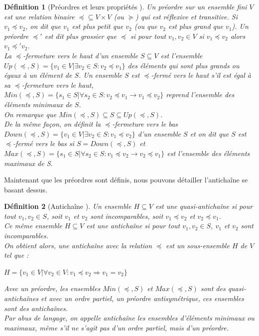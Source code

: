 \documentclass[11pt,a4paper,oneside]{book}
\theoremstyle{break}
\newtheorem{defin}{Définition}
\theoremstyle{breakplain}
\begin{document}
\begin{defin}[Préordres et leurs propriétés \cite{doyen2010antichain}]
Un préordre sur un ensemble fini $V$ est une relation binaire $\preceq \subseteq V \times V$ (ou $\succeq$) qui est réflexive et transitive. Si $v_1 \preceq v_2$, on dit que $v_1$ est plus petit que $v_2$ (ou que $v_2$ est plus grand que $v_1$).
Un préordre $\preceq'$ est dit plus grossier que $\preceq$ si pour tout $v_1, v_2 \in V$ si $v_1 \preceq v_2$ alors $v_1 \preceq' v_2$.\\
La $\preceq$-fermeture vers le haut d'un ensemble $S \subseteq V$ est l'ensemble $Up(\preceq, S) = \{ v_1 \in V | \exists v_2 \in S : v_2 \preceq v_1 \}$ des éléments qui sont plus grands ou égaux à un élément de $S$.
Un ensemble $S$ est $\preceq$-fermé vers le haut s'il est égal à sa $\preceq$-fermeture vers le haut, $Min(\preceq, S) = \{s_1 \in S | \forall s_2 \in S : v_2 \preceq v_1 \rightarrow v_1 \preceq v_2 \}$ reprend l'ensemble des éléments minimaux de $S$.\\
On remarque que $Min(\preceq, S) \subseteq S \subseteq Up(\preceq, S)$.\\

De la même façon, on définit la $\preceq$-fermeture vers le bas $Down(\preceq, S) = \{ v_1 \in V | \exists v_2 \in S : v_1 \preceq v_2 \}$ d'un ensemble $S$ et on dit que $S$ est $\preceq$-fermé vers le bas si $S = Down(\preceq, S)$ et $Max(\preceq, S) = \{s_1 \in S | \forall s_2 \in S : v_1 \preceq v_2 \rightarrow v_2 \preceq v_1 \}$ est l'ensemble des éléments maximaux de S.

\end{defin}

Maintenant que les préordres sont définis, nous pouvons détailler l'antichaîne se basant dessus.

\begin{defin}[Antichaîne \cite{doyen2010antichain}]
Un ensemble $H \subseteq V$ est une quasi-antichaîne si pour tout $v_1 , v_2 \in S$, soit $v_1$ et $v_2$ sont incomparables, soit $ v_1 \preceq v_2$ et $v_2 \preceq v_1$.\\
Ce même ensemble $H \subseteq V$ est une antichaîne si pour tout $v_1 , v_2 \in S$, $v_1$ et $v_2$ sont incomparables.\\
On obtient alors, une antichaîne avec la relation $\preceq$ est un sous-ensemble $H$ de $V$ tel que :
\begin{center}
$H = \{v_1 \in V|\forall v_2 \in V : v_1 \preceq v_2 \Rightarrow v_1 = v_2\}$
\end{center}

Avec un préordre, les ensembles $Min(\preceq, S)$ et $Max(\preceq, S)$ sont des quasi-antichaînes et avec un ordre partiel, un préordre antisymétrique, ces ensembles sont des antichaînes.\\
Par abus de langage, on appelle antichaîne les ensembles d'éléments minimaux ou maximaux, même s'il ne s'agit pas d'un ordre partiel, mais d'un préordre.

\end{defin}
\end{document}
